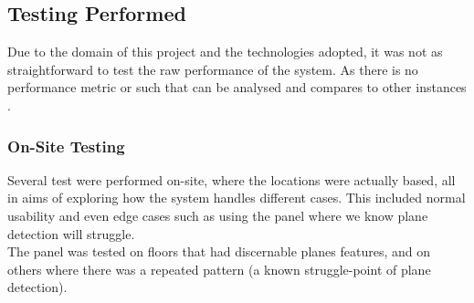 \subsection{Testing Performed}
Due to the domain of this project and the technologies adopted, it was not as straightforward to 
test the raw performance of the system. As there is no performance metric or such that can be 
analysed and compares to other instances \cite{Samini2017}. 
\subsubsection{On-Site Testing}
Several test were performed on-site, where the locations were actually based, all in aims of exploring how the system handles different cases. 
This included normal usability and even edge cases such as using the panel where we know plane detection will struggle.
\\
The panel was tested on floors that had discernable planes features, and on others where there was a repeated pattern (a known struggle-point of plane detection).\\




